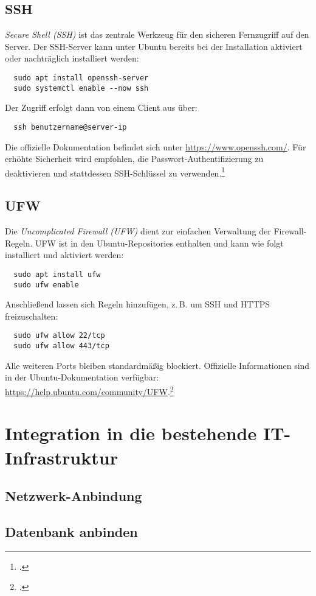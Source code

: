 \documentclass[12pt,a4paper]{report}
\begin{document}
  \subsection{SSH}  
  \emph{Secure Shell (SSH)} ist das zentrale Werkzeug für den sicheren Fernzugriff auf den Server.  
  Der SSH-Server kann unter Ubuntu bereits bei der Installation aktiviert oder nachträglich installiert werden:  
  \begin{verbatim}
  sudo apt install openssh-server
  sudo systemctl enable --now ssh
  \end{verbatim}  
  Der Zugriff erfolgt dann von einem Client aus über:  
  \begin{verbatim}
  ssh benutzername@server-ip
  \end{verbatim}  
  Die offizielle Dokumentation befindet sich unter \url{https://www.openssh.com/}.  
  Für erhöhte Sicherheit wird empfohlen, die Passwort-Authentifizierung zu deaktivieren und stattdessen SSH-Schlüssel zu verwenden.\footcite[Vgl.][Kapitel~22, S.~926~ff.]{nemeth_unixlinux}  

  \subsection{UFW}  
  Die \emph{Uncomplicated Firewall (UFW)} dient zur einfachen Verwaltung der Firewall-Regeln.  
  UFW ist in den Ubuntu-Repositories enthalten und kann wie folgt installiert und aktiviert werden:  
  \begin{verbatim}
  sudo apt install ufw
  sudo ufw enable
  \end{verbatim}  
  Anschließend lassen sich Regeln hinzufügen, z.\,B. um SSH und HTTPS freizuschalten:  
  \begin{verbatim}
  sudo ufw allow 22/tcp
  sudo ufw allow 443/tcp
  \end{verbatim}  
  Alle weiteren Ports bleiben standardmäßig blockiert.  
  Offizielle Informationen sind in der Ubuntu-Dokumentation verfügbar: \url{https://help.ubuntu.com/community/UFW}.\footcite[Vgl.][Kapitel~22, S.~932~ff.]{nemeth_unixlinux}  

\section{Integration in die bestehende IT-Infrastruktur}
  \subsection{Netzwerk-Anbindung}  
  \subsection{Datenbank anbinden}
\end{document}
